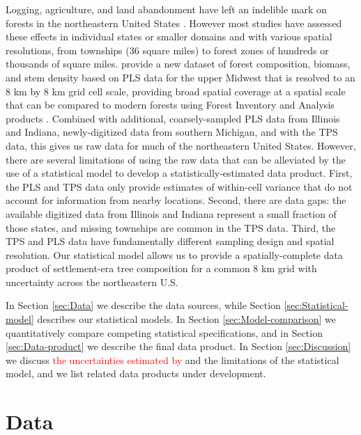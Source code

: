 \documentclass[12pt]{article}\usepackage[]{graphicx}\usepackage[]{color}
\begin{document}
Logging, agriculture, and land abandonment have left an indelible
mark on forests in the northeastern United States \citep{foster1998land,rhemtulla2009legacies,thompson2013four,goring2015composition}.
However most studies have assessed these effects in individual states
or smaller domains \citep{friedman2005regional,rhemtulla2009historical}
and with various spatial resolutions, from townships (36 square miles)
to forest zones of hundreds or thousands of square miles. \citet{goring2015composition}
provide a new dataset of forest composition, biomass, and stem density
based on PLS data for the upper Midwest that is resolved to an 8 km
by 8 km grid cell scale, providing broad spatial coverage at a spatial
scale that can be compared to modern forests using Forest Inventory
and Analysis products \citep{gray2012forest}. Combined with additional,
coarsely-sampled PLS data from Illinois and Indiana, newly-digitized
data from southern Michigan, and with the TPS data, this gives us
raw data for much of the northeastern United States. However, there
are several limitations of using the raw data that can be alleviated
by the use of a statistical model to develop a statistically-estimated
data product. First, the PLS and TPS data only provide estimates of
within-cell variance that do not account for information from nearby
locations. Second, there are data gaps: the available digitized data
from Illinois and Indiana represent a small fraction of those states,
and missing townships are common in the TPS data. Third, the TPS and
PLS data have fundamentally different sampling design and spatial
resolution. Our statistical model allows us to provide a spatially-complete
data product of settlement-era tree composition for a common 8 km
grid with uncertainty across the northeastern U.S.

In Section \ref{sec:Data} we describe the data sources, while Section
\ref{sec:Statistical-model} describes our statistical models. In
Section \ref{sec:Model-comparison} we quantitatively compare competing
statistical specifications, and in Section \ref{sec:Data-product}
we describe the final data product. In Section \ref{sec:Discussion}
we discuss \textcolor{red}{the uncertainties estimated by }and the
limitations of the statistical model, and we list related data products
under development.




\section{Data\label{sec:Data}}
\end{document}
